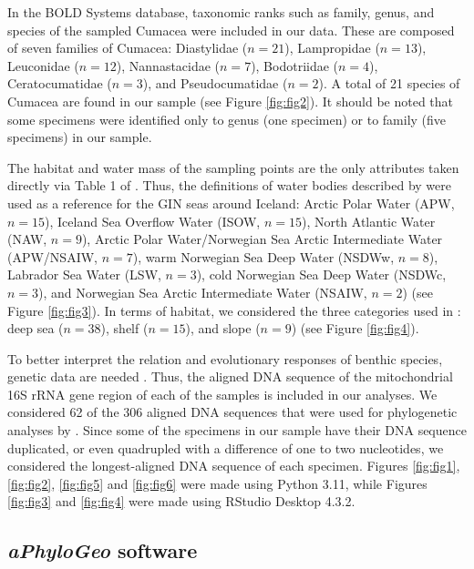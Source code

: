 In the BOLD Systems database, taxonomic ranks such as family, genus, and species of the sampled Cumacea were included in our data. These are composed of seven families of Cumacea: Diastylidae ($n=21$), Lampropidae ($n=13$), Leuconidae ($n=12$), Nannastacidae ($n=7$), Bodotriidae ($n=4$), Ceratocumatidae ($n=3$), and Pseudocumatidae ($n=2$). A total of 21 species of Cumacea are found in our sample (see Figure \ref{fig:fig2}). It should be noted that some specimens were identified only to genus (one specimen) or to family (five specimens) in our sample.

The habitat and water mass of the sampling points are the only attributes taken directly via Table 1 of \citep{uhlir_adding_2021}. Thus, the definitions of water bodies described by \citep{hansen_north_2000, brix2010distribution, ostmann_marine_2014} were used as a reference for the GIN seas around Iceland: Arctic Polar Water (APW, $n=15$), Iceland Sea Overflow Water (ISOW, $n=15$), North Atlantic Water (NAW, $n=9$), Arctic Polar Water/Norwegian Sea Arctic Intermediate Water (APW/NSAIW, $n=7$), warm Norwegian Sea Deep Water (NSDWw, $n=8$), Labrador Sea Water (LSW, $n=3$), cold Norwegian Sea Deep Water (NSDWc, $n=3$), and Norwegian Sea Arctic Intermediate Water (NSAIW, $n=2$) (see Figure \ref{fig:fig3}). In terms of habitat, we considered the three categories used in \citep{uhlir_adding_2021}: deep sea ($n=38$), shelf ($n=15$), and slope ($n=9$) (see Figure \ref{fig:fig4}).

To better interpret the relation and evolutionary responses of benthic species, genetic data are needed \citep{wilson_speciation_1987, uhlir_adding_2021}. Thus, the aligned DNA sequence of the mitochondrial 16S rRNA gene region of each of the samples is included in our analyses. We considered 62 of the 306 aligned DNA sequences that were used for phylogenetic analyses by \citep{uhlir_adding_2021}. Since some of the specimens in our sample have their DNA sequence duplicated, or even quadrupled with a difference of one to two nucleotides, we considered the longest-aligned DNA sequence of each specimen. Figures \ref{fig:fig1}, \ref{fig:fig2}, \ref{fig:fig5} and \ref{fig:fig6} were made using Python 3.11, while Figures \ref{fig:fig3} and \ref{fig:fig4} were made using RStudio Desktop 4.3.2.

\subsection{\textit{aPhyloGeo} software}

